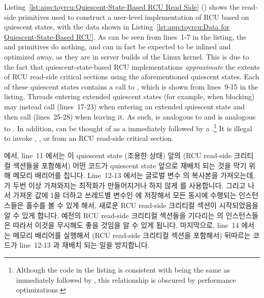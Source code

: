Listing~\ref{lst:app:toyrcu:Quiescent-State-Based RCU Read Side}
()
shows the read-side primitives used to construct a user-level
implementation of RCU based on quiescent states, with the data shown in
Listing~\ref{lst:app:toyrcu:Data for Quiescent-State-Based RCU}.
As can be seen from lines~1-7 in the listing, the 
and  primitives do nothing, and can in fact
be expected to be inlined and optimized away, as they are in
server builds of the Linux kernel.
This is due to the fact that quiescent-state-based RCU implementations
\emph{approximate} the extents of RCU read-side critical sections
using the aforementioned quiescent states.
Each of these quiescent states contains a call to
, which is shown from lines~9-15 in the listing.
Threads entering extended quiescent states (for example, when blocking)
may instead call  (lines~17-23) when entering
an extended quiescent state and then call
 (lines~25-28) when leaving it.
As such,  is analogous to 
and  is analogous to .
In addition,  can be thought of as a
 immediately followed by a
.\footnote{
	Although the code in the listing is consistent with
	being the same as  immediately followed by
	, this relationship is obscured by
	performance optimizations.}
It is illegal to invoke , ,
or  from an RCU read-side critical section.
\fi

 에서, line~11 에서는 이 quiescent state (조용한
상태) 앞의 (RCU read-side 크리티컬 섹션들을 포함해서) 어떤 코드가 quiescent
state 앞으로 재배치 되는 것을 막기 위해 메모리 배리어를 칩니다.
Line~12-13 에서는 글로벌 변수  의 복사본을 가져오는데,
 가 두번 이상 가져와지는 최적화가 만들어지거나 하지 않게
 를 사용합니다. 그리고 나서 가져온 값에 1을 더하고 쓰레드별
변수인  에 저장해서 모든 동시에 수행되는
 인스턴스들은 홀수를 볼 수 있게 해서, 새로운 RCU read-side
크리티컬 섹션이 시작되었음을 알 수 있게 합니다.
예전의 RCU read-side 크리티컬 섹션들을 기다리는  의
인스턴스들은 따라서 이것을 무시해도 좋을 것임을 알 수 있게 됩니다.
마지막으로, line~14 에서는 메모리 배리어를 실행해서 (RCU read-side 크리티컬
섹션을 포함해서) 뒤따르는 코드가 line~12-13 과 재배치 되는 일을 방지합니다.
\iffalse

